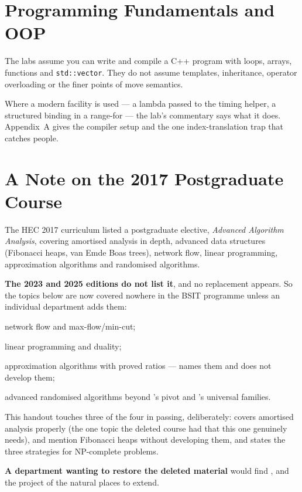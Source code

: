 \section{Programming Fundamentals and OOP}

\begin{conceptbox}
The labs assume you can write and compile a C++ program with loops, arrays,
functions and \texttt{std::vector}. They do not assume templates, inheritance,
operator overloading or the finer points of move semantics.

\smallskip
Where a modern facility is used --- a lambda passed to the timing helper, a
structured binding in a range-for --- the lab's commentary says what it does.
Appendix~A gives the compiler setup and the one index-translation trap that
catches people.
\end{conceptbox}

\section{A Note on the 2017 Postgraduate Course}

\begin{conceptbox}
The HEC 2017 curriculum listed a postgraduate elective, \emph{Advanced
Algorithm Analysis}, covering amortised analysis in depth, advanced data
structures (Fibonacci heaps, van Emde Boas trees), network flow, linear
programming, approximation algorithms and randomised algorithms.

\smallskip
\textbf{The 2023 and 2025 editions do not list it}, and no replacement appears.
So the topics below are now covered nowhere in the BSIT programme unless an
individual department adds them:

\begin{tight}
  \item network flow and max-flow/min-cut;
  \item linear programming and duality;
  \item approximation algorithms with proved ratios ---
         names them and does not develop them;
  \item advanced randomised algorithms beyond 's pivot and
        's universal families.
\end{tight}

\smallskip
This handout touches three of the four in passing, deliberately:
 covers amortised analysis properly (the one topic the deleted
course had that this one genuinely needs),  and
 mention Fibonacci heaps without developing them, and
 states the three strategies for NP-complete problems.

\smallskip
\textbf{A department wanting to restore the deleted material} would find
,  and the project of  the
natural places to extend.
\end{conceptbox}

